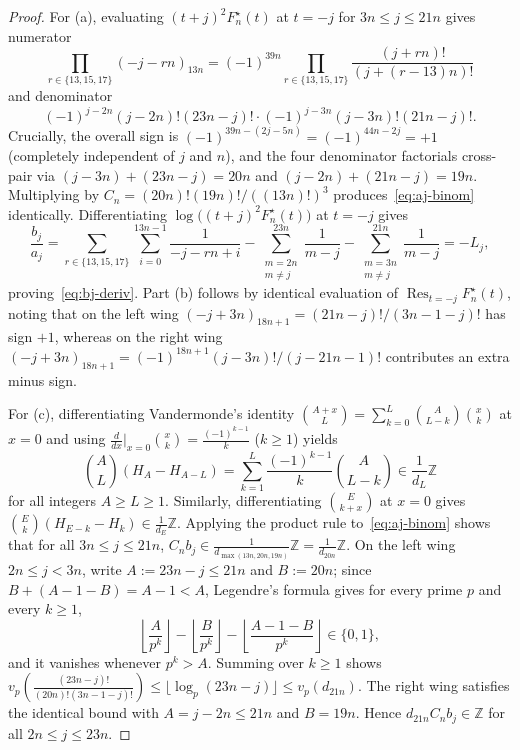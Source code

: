 \documentclass[11pt,reqno]{amsart}
\theoremstyle{definition}
\theoremstyle{remark}
\newcommand{\ZZ}{\mathbb{Z}}
\newcommand{\Res}{\operatorname{Res}}
\begin{document}
\begin{proof}
For (a), evaluating $(t + j)^2 F_n^{\star}(t)$ at $t = -j$ for $3n \le j \le 21n$ gives numerator
\[
  \prod_{r \in \{13, 15, 17\}} (-j - rn)_{13n}
  = (-1)^{39n} \prod_{r \in \{13, 15, 17\}} \frac{(j + rn)!}{(j + (r - 13)n)!}
\]
and denominator
\[
  (-1)^{j - 2n}(j - 2n)!(23n - j)! \cdot (-1)^{j - 3n}(j - 3n)!(21n - j)!.
\]
Crucially, the overall sign is $(-1)^{39n - (2j - 5n)} = (-1)^{44n - 2j} = +1$ (completely independent of $j$ and $n$), and the four denominator factorials cross-pair via $(j - 3n) + (23n - j) = 20n$ and $(j - 2n) + (21n - j) = 19n$. Multiplying by $C_n = (20n)!(19n)!/((13n)!)^3$ produces~\eqref{eq:aj-binom} identically. Differentiating $\log\bigl((t+j)^2 F_n^{\star}(t)\bigr)$ at $t = -j$ gives
\[
  \frac{b_j}{a_j}
  = \sum_{r \in \{13,15,17\}} \sum_{i=0}^{13n-1} \frac{1}{-j - rn + i}
    - \sum_{\substack{m=2n \\ m \ne j}}^{23n} \frac{1}{m - j}
    - \sum_{\substack{m=3n \\ m \ne j}}^{21n} \frac{1}{m - j}
  = -L_j,
\]
proving~\eqref{eq:bj-deriv}. Part (b) follows by identical evaluation of $\Res_{t=-j} F_n^{\star}(t)$, noting that on the left wing $(-j + 3n)_{18n+1} = (21n - j)!/(3n - 1 - j)!$ has sign $+1$, whereas on the right wing $(-j + 3n)_{18n+1} = (-1)^{18n+1}(j - 3n)!/(j - 21n - 1)!$ contributes an extra minus sign.

For (c), differentiating Vandermonde's identity $\binom{A + x}{L} = \sum_{k=0}^{L} \binom{A}{L-k}\binom{x}{k}$ at $x = 0$ and using $\frac{d}{dx}\big|_{x=0}\binom{x}{k} = \frac{(-1)^{k-1}}{k}$ ($k \ge 1$) yields
\[
  \binom{A}{L}(H_A - H_{A-L}) = \sum_{k=1}^{L} \frac{(-1)^{k-1}}{k} \binom{A}{L-k} \in \frac{1}{d_L}\ZZ
\]
for all integers $A \ge L \ge 1$. Similarly, differentiating $\binom{E}{k+x}$ at $x=0$ gives $\binom{E}{k}(H_{E-k} - H_k) \in \frac{1}{d_E}\ZZ$. Applying the product rule to~\eqref{eq:aj-binom} shows that for all $3n \le j \le 21n$, $C_n b_j \in \frac{1}{d_{\max(13n, 20n, 19n)}}\ZZ = \frac{1}{d_{20n}}\ZZ$. On the left wing $2n \le j < 3n$, write $A := 23n - j \le 21n$ and $B := 20n$; since $B + (A - 1 - B) = A - 1 < A$, Legendre's formula gives for every prime $p$ and every $k \ge 1$,
\[
  \left\lfloor \frac{A}{p^k} \right\rfloor
  - \left\lfloor \frac{B}{p^k} \right\rfloor
  - \left\lfloor \frac{A - 1 - B}{p^k} \right\rfloor \in \{0, 1\},
\]
and it vanishes whenever $p^k > A$. Summing over $k \ge 1$ shows $v_p\!\left(\frac{(23n-j)!}{(20n)!(3n-1-j)!}\right) \le \lfloor\log_p(23n-j)\rfloor \le v_p(d_{21n})$. The right wing satisfies the identical bound with $A = j - 2n \le 21n$ and $B = 19n$. Hence $d_{21n} C_n b_j \in \ZZ$ for all $2n \le j \le 23n$.
\end{proof}
\end{document}
